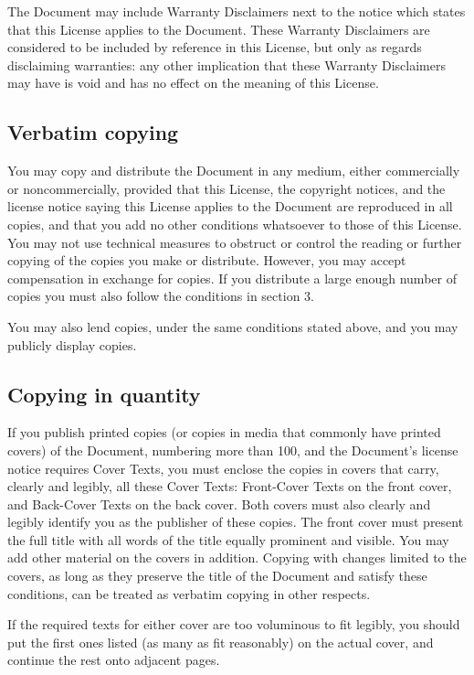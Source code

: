 \documentclass[11pt]{article}
\begin{document}
The Document may include Warranty Disclaimers next to the notice which
states that this License applies to the Document.  These Warranty
Disclaimers are considered to be included by reference in this
License, but only as regards disclaiming warranties: any other
implication that these Warranty Disclaimers may have is void and has
no effect on the meaning of this License.


\subsection*{Verbatim copying}
\label{sec:verbatim-copying}

You may copy and distribute the Document in any medium, either
commercially or noncommercially, provided that this License, the
copyright notices, and the license notice saying this License applies
to the Document are reproduced in all copies, and that you add no other
conditions whatsoever to those of this License.  You may not use
technical measures to obstruct or control the reading or further
copying of the copies you make or distribute.  However, you may accept
compensation in exchange for copies.  If you distribute a large enough
number of copies you must also follow the conditions in section 3.

You may also lend copies, under the same conditions stated above, and
you may publicly display copies.

\subsection*{Copying in quantity}
\label{sec:copying-quantity}

If you publish printed copies (or copies in media that commonly have
printed covers) of the Document, numbering more than 100, and the
Document's license notice requires Cover Texts, you must enclose the
copies in covers that carry, clearly and legibly, all these Cover
Texts: Front-Cover Texts on the front cover, and Back-Cover Texts on
the back cover.  Both covers must also clearly and legibly identify
you as the publisher of these copies.  The front cover must present
the full title with all words of the title equally prominent and
visible.  You may add other material on the covers in addition.
Copying with changes limited to the covers, as long as they preserve
the title of the Document and satisfy these conditions, can be treated
as verbatim copying in other respects.

If the required texts for either cover are too voluminous to fit
legibly, you should put the first ones listed (as many as fit
reasonably) on the actual cover, and continue the rest onto adjacent
pages.
\end{document}

